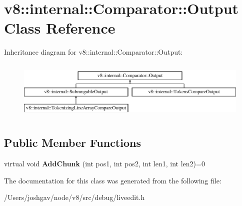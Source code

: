 \hypertarget{classv8_1_1internal_1_1_comparator_1_1_output}{}\section{v8\+:\+:internal\+:\+:Comparator\+:\+:Output Class Reference}
\label{classv8_1_1internal_1_1_comparator_1_1_output}
Inheritance diagram for v8\+:\+:internal\+:\+:Comparator\+:\+:Output\+:\begin{figure}[H]
\begin{center}
\leavevmode
\includegraphics[height=2.866894cm]{classv8_1_1internal_1_1_comparator_1_1_output}
\end{center}
\end{figure}
\subsection*{Public Member Functions}
\begin{DoxyCompactItemize}
\item 
virtual void {\bfseries Add\+Chunk} (int pos1, int pos2, int len1, int len2)=0\hypertarget{classv8_1_1internal_1_1_comparator_1_1_output_a95429725e46fdf84692680efcd14e479}{}\label{classv8_1_1internal_1_1_comparator_1_1_output_a95429725e46fdf84692680efcd14e479}

\end{DoxyCompactItemize}


The documentation for this class was generated from the following file\+:\begin{DoxyCompactItemize}
\item 
/\+Users/joshgav/node/v8/src/debug/liveedit.\+h\end{DoxyCompactItemize}
